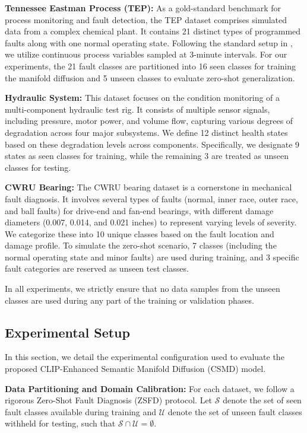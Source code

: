 \documentclass[journal,12pt,onecolumn]{IEEEtran}
\begin{document}
\textbf{Tennessee Eastman Process (TEP):} As a gold-standard benchmark for process monitoring and fault detection, the TEP dataset comprises simulated data from a complex chemical plant. It contains 21 distinct types of programmed faults along with one normal operating state. Following the standard setup in \cite{riordan2013tennessee}, we utilize continuous process variables sampled at 3-minute intervals. For our experiments, the 21 fault classes are partitioned into 16 seen classes for training the manifold diffusion and 5 unseen classes to evaluate zero-shot generalization.

\textbf{Hydraulic System:} This dataset focuses on the condition monitoring of a multi-component hydraulic test rig. It consists of multiple sensor signals, including pressure, motor power, and volume flow, capturing various degrees of degradation across four major subsystems. We define 12 distinct health states based on these degradation levels across components. Specifically, we designate 9 states as seen classes for training, while the remaining 3 are treated as unseen classes for testing.

\textbf{CWRU Bearing:} The CWRU bearing dataset is a cornerstone in mechanical fault diagnosis. It involves several types of faults (normal, inner race, outer race, and ball faults) for drive-end and fan-end bearings, with different damage diameters (0.007, 0.014, and 0.021 inches) to represent varying levels of severity. We categorize these into 10 unique classes based on the fault location and damage profile. To simulate the zero-shot scenario, 7 classes (including the normal operating state and minor faults) are used during training, and 3 specific fault categories are reserved as unseen test classes.

In all experiments, we strictly ensure that no data samples from the unseen classes are used during any part of the training or validation phases.

\subsection{Experimental Setup}
In this section, we detail the experimental configuration used to evaluate the proposed CLIP-Enhanced Semantic Manifold Diffusion (CSMD) model.

\textbf{Data Partitioning and Domain Calibration:} 
For each dataset, we follow a rigorous Zero-Shot Fault Diagnosis (ZSFD) protocol. Let $\mathcal{S}$ denote the set of seen fault classes available during training and $\mathcal{U}$ denote the set of unseen fault classes withheld for testing, such that $\mathcal{S} \cap \mathcal{U} = \emptyset$.
\end{document}
